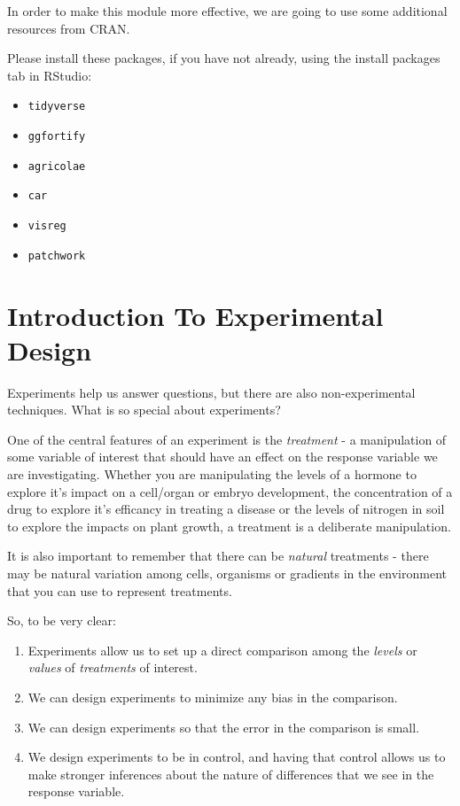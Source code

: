 \documentclass[
]{book}
\providecommand{\tightlist}{%
  \setlength{\itemsep}{0pt}\setlength{\parskip}{0pt}}
\begin{document}
In order to make this module more effective, we are going to use some additional resources from CRAN.

Please install these packages, if you have not already, using the install packages tab in RStudio:

\begin{itemize}
\tightlist
\item
  \texttt{tidyverse}
\item
  \texttt{ggfortify}
\item
  \texttt{agricolae}
\item
  \texttt{car}
\item
  \texttt{visreg}
\item
  \texttt{patchwork}
\end{itemize}

\hypertarget{introduction-to-experimental-design}{%
\chapter{Introduction To Experimental Design}\label{introduction-to-experimental-design}}

Experiments help us answer questions, but there are also non-experimental techniques. What is so special about experiments?

One of the central features of an experiment is the \emph{treatment} - a manipulation of some variable of interest that should have an effect on the response variable we are investigating. Whether you are manipulating the levels of a hormone to explore it's impact on a cell/organ or embryo development, the concentration of a drug to explore it's efficancy in treating a disease or the levels of nitrogen in soil to explore the impacts on plant growth, a treatment is a deliberate manipulation.

It is also important to remember that there can be \emph{natural} treatments - there may be natural variation among cells, organisms or gradients in the environment that you can use to represent treatments.

So, to be very clear:

\begin{enumerate}
\def\labelenumi{\arabic{enumi}.}
\tightlist
\item
  Experiments allow us to set up a direct comparison among the \emph{levels} or \emph{values} of \emph{treatments} of interest.
\item
  We can design experiments to minimize any bias in the comparison.
\item
  We can design experiments so that the error in the comparison is small.
\item
  We design experiments to be in control, and having that control allows us to make stronger inferences about the nature of differences that we see in the response variable.
\end{enumerate}
\end{document}
